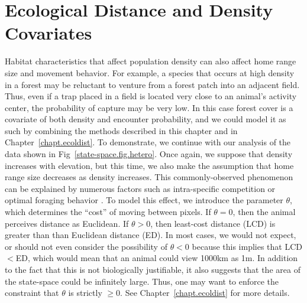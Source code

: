 \section{Ecological Distance and Density Covariates}

Habitat characteristics that affect population
density can also affect home range size and movement behavior. For
example, a
species that occurs at high density in a forest may be reluctant to
venture from a forest patch into an adjacent field. Thus, even if a
trap placed in a field is located very close to an animal's activity
center, the probability of capture may be very low. In this case
forest cover is a covariate of both density and encounter probability,
and we could model it as such by combining the methods described in
this chapter and in Chapter~\ref{chapt.ecoldist}. To demonstrate, we
continue with our analysis of the data shown in
Fig~\ref{state-space.fig.hetero}. Once again, we suppose that density
increases with elevation, but this time, we also make the
assumption that home range size decreases as density increases. This
commonly-observed phenomenon can be explained by numerous factors such
as intra-specific competition \citep{sillett_etal:2004} or optimal
foraging behavior \citep{tufto_etal:1996,said_servanty:2005}. To model
this effect, we
introduce the parameter $\theta$, which determines the ``cost'' of
moving between pixels. If $\theta=0$, then the animal perceives
distance as Euclidean. If $\theta>0$, then least-cost distance (LCD)
is greater than than Euclidean distance (ED). In most cases, we would
not expect,
or should not even consider the possibility of $\theta<0$ because this
implies that LCD$<$ED, which would mean that an animal could view
1000km as 1m. In addition to the fact that this is not biologically
justifiable, it also suggests that the area of the state-space could
be infinitely large. Thus, one may want to enforce the constraint that
$\theta$ is strictly $\geq 0$. See Chapter~\ref{chapt.ecoldist} for
more details.

